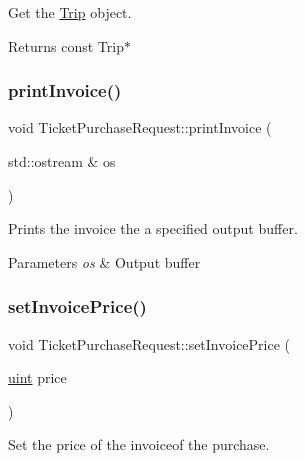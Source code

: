 Get the \mbox{\hyperlink{classTrip}{Trip}} object. 

\begin{DoxyReturn}{Returns}
const Trip$\ast$ 
\end{DoxyReturn}
\mbox{\label{classTicketPurchaseRequest_a626107dad44c79663d318573e5c6bae2}} 
\subsubsection{\texorpdfstring{print\+Invoice()}{printInvoice()}}
{\footnotesize\ttfamily void Ticket\+Purchase\+Request\+::print\+Invoice (\begin{DoxyParamCaption}\item[{std\+::ostream \&}]{os }\end{DoxyParamCaption})}



Prints the invoice the a specified output buffer. 


\begin{DoxyParams}{Parameters}
{\em os} & Output buffer \\
\hline
\end{DoxyParams}
\mbox{\label{classTicketPurchaseRequest_a35b5d38bf3d6d00f90041762f2ca93ee}} 
\subsubsection{\texorpdfstring{set\+Invoice\+Price()}{setInvoicePrice()}}
{\footnotesize\ttfamily void Ticket\+Purchase\+Request\+::set\+Invoice\+Price (\begin{DoxyParamCaption}\item[{\mbox{\hyperlink{project__utils_8h_a91ad9478d81a7aaf2593e8d9c3d06a14}{uint}}}]{price }\end{DoxyParamCaption})}



Set the price of the invoiceof the purchase. 


